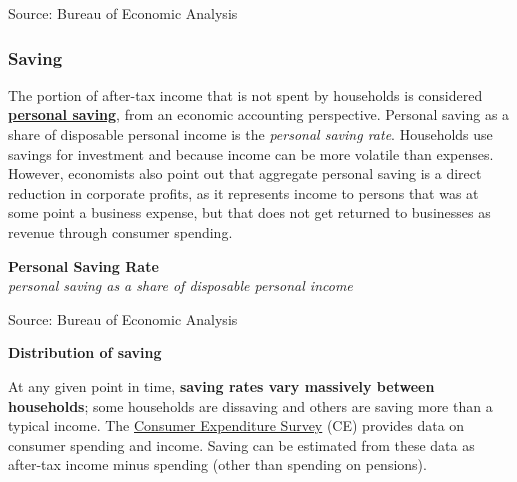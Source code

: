 \documentclass{report}
\makeatletter
\newcommand{\tbllink}[1]{\href{https://raw.githubusercontent.com/bdecon/US-chartbook/master/chartbook/data/#1}{\faTable}}
\newcommand*\short[1]{\expandafter\@gobbletwo\number\numexpr#1\relax}
\newcommand{\dateaxisticks}{
		date coordinates in=x, axis line style={draw=none},
		xmax={2022-03-15},
		max space between ticks=40,	    
		xtick={{1990-01-01}, {1992-01-01}, {1994-01-01}, 
			{1996-01-01}, {1998-01-01}, {2000-01-01}, 
			{2002-01-01}, {2004-01-01}, {2006-01-01},
			{2008-01-01}, {2010-01-01}, {2012-01-01}, {2014-01-01},
		    {2016-01-01}, {2018-01-01}, {2020-01-01}, {2022-01-01}, 
		    {2024-01-01}, {2026-01-01}},
		minor xtick={{1989-01-01}, {1991-01-01}, {1993-01-01},
			{1995-01-01}, {1997-01-01}, {1999-01-01}, 
			{2001-01-01}, {2003-01-01}, {2005-01-01}, {2007-01-01},
		    {2009-01-01}, {2011-01-01}, {2013-01-01}, {2015-01-01},
		    {2017-01-01}, {2019-01-01}, {2021-01-01}, {2023-01-01}, 
		    {2025-01-01}, {2027-01-01}},
		enlarge y limits={0.06}, enlarge x limits={0.01},
		}
\newcommand{\bbar}[2]{extra #1 ticks = {{#2}}, extra #1 tick labels = ,
		extra #1 tick style = {grid=major, grid style={thick, black!25}},}
\newcommand{\stdline}[4]{\addplot[very thick, no markers, color=#1] 
		table [x=#2, y=#3, col sep=comma] {#4};	}
\newcommand{\rbars}{
		\fill[color=black!10] (axis cs:{1990-07-01},\pgfkeysvalueof{/pgfplots/ymin}) rectangle 
			(axis cs:{1991-03-01}, \pgfkeysvalueof{/pgfplots/ymax});
		\fill[color=black!10] (axis cs:{2007-12-01},\pgfkeysvalueof{/pgfplots/ymin}) rectangle 
			(axis cs:{2009-07-01}, \pgfkeysvalueof{/pgfplots/ymax});
		\fill[color=black!10] (axis cs:{2001-03-01},\pgfkeysvalueof{/pgfplots/ymin}) rectangle 
			(axis cs:{2001-11-01}, \pgfkeysvalueof{/pgfplots/ymax});
		\fill[color=black!10] (axis cs:{2020-02-01},\pgfkeysvalueof{/pgfplots/ymin}) rectangle 
			(axis cs:{2020-05-01}, \pgfkeysvalueof{/pgfplots/ymax});}
\makeatother
\begin{document}
{\begin{minipage}{0.76\textwidth}
\footnotesize{Source: Bureau of Economic Analysis} \hfill \tbllink{pcedecomp.csv}
\end{minipage}
\newpage
\begin{minipage}{0.76\textwidth}
\subsubsection*{Saving}
\small The portion of after-tax income that is not spent by households is considered \textbf{\href{https://www.bea.gov/index.php/help/glossary/personal-saving}{personal saving}}, from an economic accounting perspective. Personal saving as a share of disposable personal income is the \textit{personal saving rate}. Households use savings for investment and because income can be more volatile than expenses. However, economists also point out that aggregate personal saving is a direct reduction in corporate profits, as it represents income to persons that was at some point a business expense, but that does not get returned to businesses as revenue through consumer spending. 


\vspace{1mm}

\normalsize \textbf{Personal Saving Rate}\\
\footnotesize{\textit{personal saving as a share of disposable personal income}}
\vspace{3.4cm}

\hspace{4mm} 

\footnotesize{Source: Bureau of Economic Analysis} \hfill \tbllink{psavert.csv}
\vspace{4mm}

\normalsize \textbf{Distribution of saving}
\vspace{-1mm}

\small At any given point in time, \textbf{saving rates vary massively between households}; some households are dissaving and others are saving more than a typical income. The \href{https://www.bls.gov/cex/}{Consumer Expenditure Survey} (CE) provides data on consumer spending and income. Saving can be estimated from these data as after-tax income minus spending (other than spending on pensions). 
\end{minipage}

}
\end{document}
